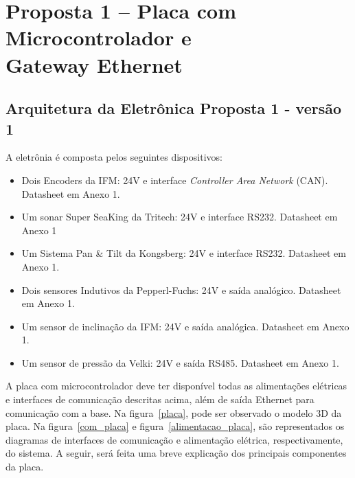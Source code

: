 


\section[Proposta 1 – Placa com Microcontrolador e Gateway Ethernet]{Proposta 1
– Placa com Microcontrolador e \\Gateway Ethernet}

\subsection{Arquitetura da Eletrônica Proposta 1 - versão 1}
A eletrônia é composta pelos seguintes dispositivos:
\begin{itemize}
  \item Dois Encoders da IFM: 24V e interface \textit{Controller Area Network}
  (CAN).
  Datasheet em Anexo 1.
  \item Um sonar Super SeaKing da Tritech: 24V e interface RS232. Data\-sheet em
  Anexo 1
  \item Um Sistema Pan \& Tilt da Kongsberg: 24V e interface RS232. Data\-sheet
  em Anexo 1.
  \item Dois sensores Indutivos da Pepperl-Fuchs: 24V e saída ana\-lógico.
  Data\-sheet em Anexo 1.
  \item Um sensor de inclinação da IFM: 24V e saída analógica.
  Data\-sheet em Anexo 1.
  \item Um sensor de pressão da Velki: 24V e saída RS485. Datasheet em Anexo 1.
\end{itemize}

A placa com microcontrolador deve ter disponível todas as alimentações elétricas
e interfaces de comunicação descritas acima, além de saída Ethernet para
comunicação com a base. Na figura~\ref{placa}, pode ser observado o modelo 3D da
placa. Na figura~\ref{com_placa} e figura~\ref{alimentacao_placa}, são
representados os diagramas de interfaces de comunicação e alimentação elétrica,
respectivamente, do sistema. A seguir, será feita uma breve explicação dos
principais componentes da placa.

